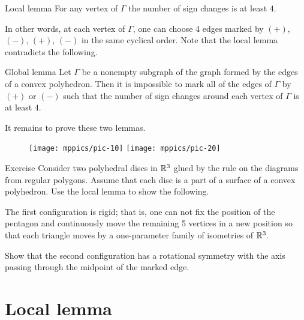 \begin{thm}{Local lemma}\label{lem:local}
For any vertex of $\Gamma$ the number of sign changes is at least $4$.
\end{thm}

In other words, at each vertex of $\Gamma$, one can choose 4 edges marked by $(+)$, $(-)$, $(+)$, $(-)$ in the same cyclical order.
Note that the local lemma contradicts the following.

\begin{thm}{Global lemma}\label{lem:global}
Let $\Gamma$ be a nonempty subgraph of the graph formed by the edges of a convex polyhedron. Then it is impossible to mark all of the edges of $\Gamma$ by $(+)$ or $(-)$ 
such that the number of sign changes around each vertex of $\Gamma$ is at least $4$.
\end{thm}

It remains to prove these two lemmas.
\qeds

\begin{wrapfigure}{r}{20mm}
\vskip-0mm
\centering
\texttt{[image: mppics/pic-10]}
\bigskip
\texttt{[image: mppics/pic-20]}
\vskip-0mm
\end{wrapfigure}

\begin{thm}{Exercise}\label{ex:disc-bend}
Consider two polyhedral discs in $\mathbb{R}^3$ glued by the rule on the diagrams from regular polygons.
Assume that each disc is a part of a surface of a convex polyhedron.
Use the local lemma to show the following.



\begin{subthm}{}
The first configuration is rigid; that is, one can not fix the position of the pentagon and continuously move the remaining 5 vertices in a new position so that each triangle moves by a one-parameter family of isometries of $\mathbb{R}^3$.
\end{subthm}

\begin{subthm}{}
Show that the second configuration has a rotational symmetry with the axis passing through the midpoint of the marked edge.
\end{subthm}

\end{thm}


\section{Local lemma}

